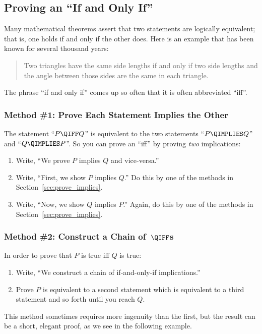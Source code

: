 \subsection{Proving an ``If and Only If''}\label{sec:prove_iff}

Many mathematical theorems assert that two statements are logically
equivalent; that is, one holds if and only if the other does.  Here is an
example that has been known for several thousand years:
\begin{quote}
Two triangles have the same side lengths if and only if two
side lengths and the angle between those sides are the same in each
triangle.
\end{quote}

The phrase ``if and only if'' comes up so often that it is often
abbreviated ``iff''.

\subsubsection{Method \#1:  Prove Each Statement Implies the Other}

The statement ``$P \QIFF Q$'' is equivalent to the two statements ``$P
\QIMPLIES Q$'' and ``$Q \QIMPLIES P$''.  So you can prove an ``iff'' by
proving \textit{two} implications:
%
\begin{enumerate}
\item Write, ``We prove $P$ implies $Q$ and vice-versa.''
\item Write, ``First, we show $P$ implies $Q$.'' Do this by one
of the methods in Section~\ref{sec:prove_implies}.
\item Write, ``Now, we show $Q$ implies $P$.''  Again, do this by
one of the methods in Section~\ref{sec:prove_implies}.
\end{enumerate}

\subsubsection{Method \#2: Construct a Chain of~$\QIFF$s}
In order to prove that $P$ is true iff $Q$ is true:
%
\begin{enumerate}
\item Write, ``We construct a chain of if-and-only-if implications.''
\item Prove $P$ is equivalent to a second statement which is
equivalent to a third statement and so forth until you reach $Q$.
\end{enumerate}
%
This method sometimes requires more ingenuity than the first, but the
result can be a short, elegant proof, as we see in the following
example.

